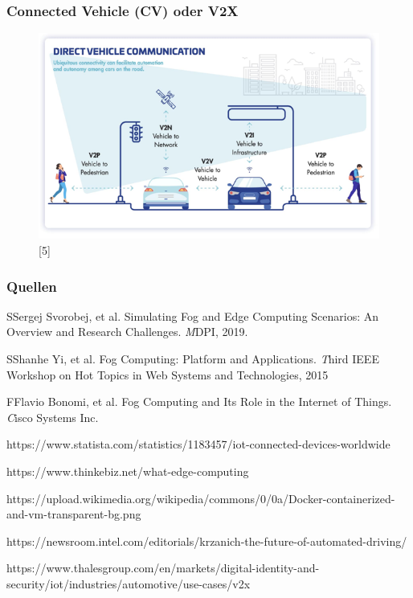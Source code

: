 \documentclass{beamer}
\begin{document}

\begin{frame}
	\frametitle{\textbf{Connected Vehicle (CV) oder V2X}}
	\begin{figure}
		\includegraphics[width=\textwidth]{CV.png}
		\hspace*{15pt}\hbox{\scriptsize [5]}
	\end{figure}
\end{frame}


\begin{frame}[allowframebreaks]
	\frametitle{\textbf{Quellen}}
	\footnotesize{
		\begin{thebibliography}{99}
			\bibitem  SSergej Svorobej, et al.
			\newblock Simulating Fog and Edge Computing Scenarios: An Overview and Research Challenges. 
			\newblock \emph MDPI, 2019. 
			
			\bibitem  SShanhe Yi, et al.
			\newblock Fog Computing: Platform and Applications. 
			\newblock \emph Third IEEE Workshop on Hot Topics in Web Systems and Technologies, 2015
			
			\bibitem  FFlavio Bonomi, et al. 
			\newblock Fog Computing and Its Role in the Internet of Things.
			\newblock \emph Cisco Systems Inc.
			
			\newblock https://www.statista.com/statistics/1183457/iot-connected-devices-worldwide
			
			\newblock https://www.thinkebiz.net/what-edge-computing
			
			\newblock https://upload.wikimedia.org/wikipedia/commons/0/0a/Docker-containerized-and-vm-transparent-bg.png
			
			\newblock https://newsroom.intel.com/editorials/krzanich-the-future-of-automated-driving/
			
			\newblock https://www.thalesgroup.com/en/markets/digital-identity-and-security/iot/industries/automotive/use-cases/v2x
			
		\end{thebibliography}
	}
	    
\end{frame}
\end{document}
